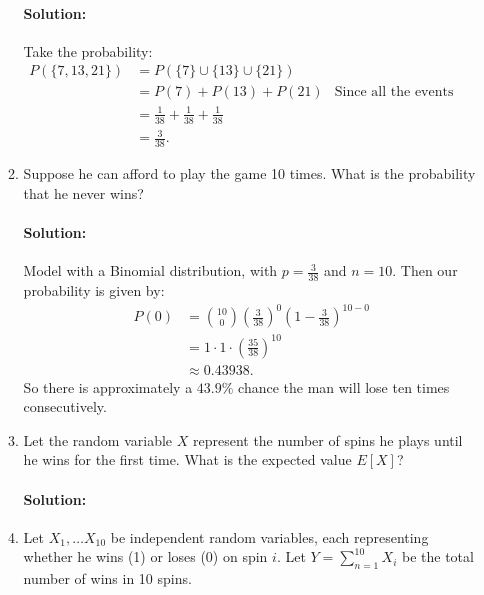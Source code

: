 \documentclass{article}
\begin{document}
\begin{enumerate}
\begin{enumerate}
        \paragraph{Solution: } Take the probability:
        \begin{align*}
            P(\{7,13,21\})&= P(\{7\} \cup \{13\} \cup \{21\} ) \\
            &= P(7)+P(13)+P(21)&\text{Since all the events are disjoint} \\
            &= \frac{1}{38}+ \frac{1}{38}+\frac{1}{38}\\
            &=\frac{3}{38}
        .\end{align*}

    \item Suppose he can afford to play the game 10 times. What is the probability that he never wins?
        \paragraph{Solution: }Model with a Binomial distribution, with $p=\frac{3}{38}$ and $n=10$. Then our probability is given by: %
        \begin{align*}
            P(0)&=\binom{10}{0}\left( \frac{3}{38} \right)^0\left( 1-\frac{3}{38} \right)^{10-0}\\
            &= 1\cdot 1\cdot \left( \frac{35}{38} \right) ^{10} \\
            &\approx 0.43938 
        .\end{align*}
        So there is approximately a $43.9\%$ chance the man will lose ten times consecutively.

    \item Let the random variable $X$ represent the number of spins he plays until he wins for the first time. What is the expected value $E[X]$?
        \paragraph{Solution: }
    \item Let $X_1,\dots X_{10}$ be independent random variables, each representing whether he wins (1) or loses (0) on spin $i$. Let $Y=\sum_{n=1}^{10} X_i$ be the total number of wins in 10 spins.

\end{enumerate}
\end{enumerate}
\end{document}
